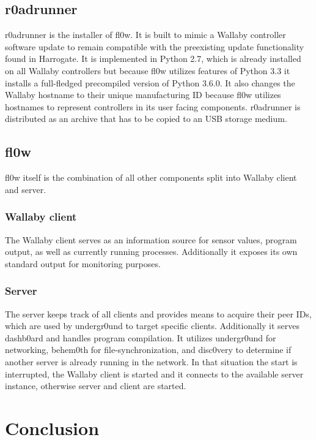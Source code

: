 \documentclass[conference]{IEEEtran}
\begin{document}
\subsection{r0adrunner}
r0adrunner is the installer of fl0w. It is built to mimic a Wallaby controller software update to remain compatible with the preexisting update functionality found in Harrogate. It is implemented in Python 2.7, which is already installed on all Wallaby controllers but because fl0w utilizes features of Python 3.3 it installs a full-fledged precompiled version of Python 3.6.0. It also changes the Wallaby hostname to their unique manufacturing ID because fl0w utilizes hostnames to represent controllers in its user facing components. r0adrunner is distributed as an archive that has to be copied to an USB storage medium.

\subsection{fl0w}
fl0w itself is the combination of all other components split into Wallaby client and server.\\

\subsubsection{Wallaby client}
The Wallaby client serves as an information source for sensor values, program output, as well as currently running processes. Additionally it exposes its own standard output for monitoring purposes.\\

\subsubsection{Server}
The server keeps track of all clients and provides means to acquire their peer IDs, which are used by undergr0und to target specific clients. Additionally it serves dashb0ard and handles program compilation. It utilizes undergr0und for networking, behem0th for file-synchronization, and disc0very to determine if another server is already running in the network. In that situation the start is interrupted, the Wallaby client is started and it connects to the available server instance, otherwise server and client are started. \\

\section{Conclusion}
\end{document}

